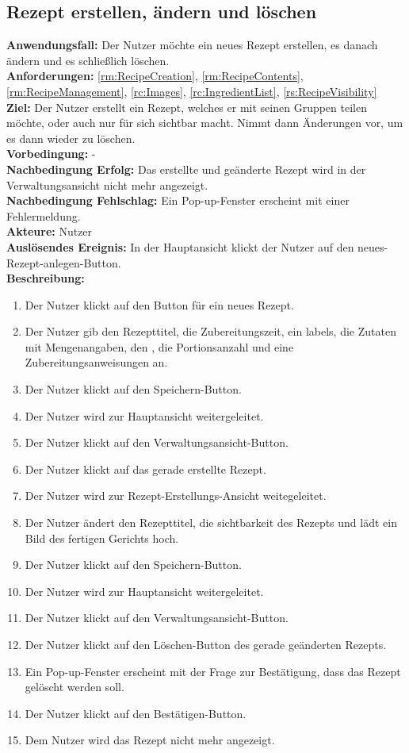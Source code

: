 \documentclass[parskip=full]{scrartcl}
\begin{document}
\subsection{Rezept erstellen, ändern und löschen}
\textbf{Anwendungsfall:} Der Nutzer möchte ein neues Rezept erstellen, es danach ändern und es schließlich löschen.\\
\textbf{Anforderungen:} \ref{rm:RecipeCreation}, \ref{rm:RecipeContents}, \ref{rm:RecipeManagement}, \ref{rc:Images}, \ref{rc:IngredientList}, \ref{rs:RecipeVisibility}\\
\textbf{Ziel:} Der Nutzer erstellt ein Rezept, welches er mit seinen Gruppen teilen möchte, oder auch nur für sich sichtbar macht. Nimmt dann Änderungen vor, um es dann wieder zu löschen.\\
\textbf{Vorbedingung:} -\\
\textbf{Nachbedingung Erfolg:} Das erstellte und geänderte Rezept wird in der Verwaltungsansicht nicht mehr angezeigt.  \\
\textbf{Nachbedingung Fehlschlag:} Ein Pop-up-Fenster erscheint mit einer Fehlermeldung.\\
\textbf{Akteure:} Nutzer\\
\textbf{Auslösendes Ereignis:} In der Hauptansicht klickt der Nutzer auf den neues-Rezept-anlegen-Button.\\
\textbf{Beschreibung:}
\begin{enumerate}
    \item Der Nutzer klickt auf den Button für ein neues Rezept.
    \item Der Nutzer gib den Rezepttitel, die Zubereitungszeit, ein \gls{labels}, die Zutaten mit Mengenangaben, den , die Portionsanzahl und eine Zubereitungsanweisungen an.
    \item Der Nutzer klickt auf den Speichern-Button.
    \item Der Nutzer wird zur Hauptansicht weitergeleitet.
    \item Der Nutzer klickt auf den Verwaltungsansicht-Button.
    \item Der Nutzer klickt auf das gerade erstellte Rezept.
    \item Der Nutzer wird zur Rezept-Erstellungs-Ansicht weitegeleitet.
    \item Der Nutzer ändert den Rezepttitel, die \gls{sichtbarkeit} des Rezepts und lädt ein Bild des fertigen Gerichts hoch.
    \item Der Nutzer klickt auf den Speichern-Button.
    \item Der Nutzer wird zur Hauptansicht weitergeleitet.
    \item Der Nutzer klickt auf den Verwaltungsansicht-Button.
    \item Der Nutzer klickt auf den Löschen-Button des gerade geänderten Rezepts.
    \item Ein Pop-up-Fenster erscheint mit der Frage zur Bestätigung, dass das Rezept gelöscht werden soll.
    \item Der Nutzer klickt auf den Bestätigen-Button.
    \item Dem Nutzer wird das Rezept nicht mehr angezeigt.
\end{enumerate}
\end{document}
